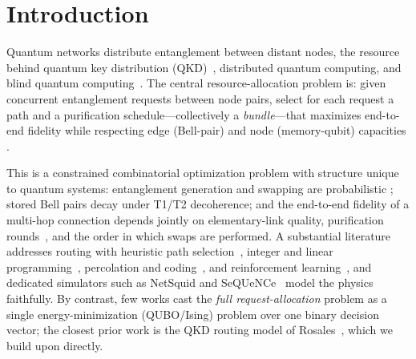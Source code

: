 \documentclass[twocolumn]{article}
\begin{document}
\section{Introduction}
\label{sec:intro}

Quantum networks distribute entanglement between distant nodes, the
resource behind quantum key distribution
(QKD)~\cite{ekert1991quantum,gisin2002quantum,scarani2009security,
pirandola2020advances}, distributed quantum
computing, and blind quantum
computing~\cite{kimble2008quantum,wehner2018quantum,simon2017towards}.
The central resource-allocation problem is: given concurrent
entanglement requests between node pairs, select for each request a
path and a purification schedule---collectively a \emph{bundle}---that
maximizes end-to-end fidelity while respecting edge (Bell-pair) and
node (memory-qubit) capacities \cite{briegel1998quantum,
dur1999entanglement,sangouard2011quantum,azuma2023quantum}.

This is a constrained combinatorial optimization problem with
structure unique to quantum systems: entanglement generation and
swapping are probabilistic \cite{bennett1993teleporting,
vanmeter2014quantum}; stored Bell pairs decay under T1/T2
decoherence; and the end-to-end fidelity of a multi-hop connection
depends jointly on elementary-link quality, purification
rounds~\cite{bennett1996purification}, and the order in which swaps
are performed.  A substantial literature addresses routing with
heuristic path selection~\cite{vanmeter2014quantum}, integer and
linear programming~\cite{pant2022routing,caleffi2017optimal,
gyongyosi2019entanglement}, percolation and
coding~\cite{cuquet2009entanglement,schoute2016shortcuts,
kozlowski2020designing}, and reinforcement
learning~\cite{li2025qlearning,boyan1993packet,mao2017routing,
rusek2020routenets}, and dedicated simulators such as NetSquid and
SeQUeNCe~\cite{coopmans2021netsquid,wu2021sequence} model the physics
faithfully.  By contrast, few works cast the \emph{full
request-allocation} problem as a single energy-minimization
(QUBO/Ising) problem over one binary decision vector; the closest
prior work is the QKD routing model of
Rosales~\cite{rosales2025quantum}, which we build upon directly.
\end{document}
